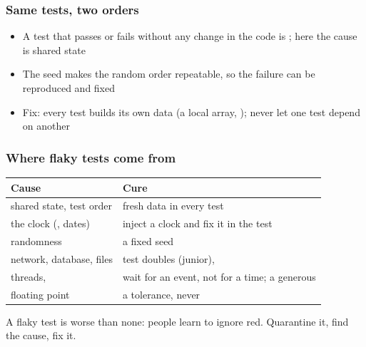 \documentclass[aspectratio=169,10pt,compress]{beamer}
\begin{document}
\begin{frame}[t,fragile] \frametitle{Same tests, two orders}

	\begin{itemize}\footnotesize
		\item<2-> A test that passes or fails without any change in the code is ; here the cause is shared state
		\item<2-> The seed makes the random order repeatable, so the failure can be reproduced and fixed
		\item<2-> Fix: every test builds its own data (a local array, ); never let one test depend on another
	\end{itemize}
\end{frame}




\begin{frame}[t,fragile] \frametitle{Where flaky tests come from}


\begin{table}
		\footnotesize
		\begin{tabular}{@{}L{0.30\textwidth}L{0.62\textwidth}@{}}
			\toprule
			\textbf{Cause} & \textbf{Cure} \\
			\midrule
			shared state, test order & fresh data in every test \\
			the clock (, dates) & inject a clock and fix it in the test \\
			randomness & a fixed seed \\
			network, database, files & test doubles (junior),  \\
			threads,  & wait for an event, not for a time; a generous  \\
			floating point & a tolerance, never \hCode{==} \\
			\bottomrule
		\end{tabular}
\end{table}%

	\footnotesize A flaky test is worse than none: people learn to ignore red. Quarantine it, find the cause, fix it.
\end{frame}
\end{document}
